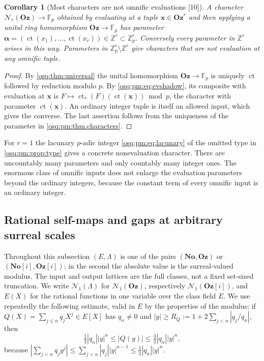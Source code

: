 \documentclass[11pt,letterpaper]{article}
\numberwithin{equation}{section}
\newtheorem{corollary}[corollary]{Corollary}
\theoremstyle{definition}
\theoremstyle{remark}
\theoremstyle{plain}
\newcommand{\No}{\mathbf{No}}
\newcommand{\Oz}{\mathbf{Oz}}
\newcommand{\SC}{\No[i]}
\newcommand{\GOz}{\Oz[i]}
\newcommand{\Z}{\mathbb Z}
\newcommand{\F}{\mathbb F}
\newcommand{\ct}{\operatorname{ct}}
\newcommand{\Num}{\mathscr N}
\newcommand{\src}[1]{\textup{\textsf{[#1]}}}
\begin{document}
\begin{corollary}[Most characters are not omnific evaluations \src{10}]
\label{osq:pm:cor:nonevaluation}
A character $\Num_r(\Oz)\to\F_p$ obtained by evaluating at a tuple $\mathbf x\in\Oz^r$
and then applying a unital ring homomorphism $\Oz\to\F_p$ has parameter
$\boldsymbol\alpha=(\ct(x_1),\dots,\ct(x_r))\in\Z^r\subset\Z_p^r$. Conversely every
parameter in $\Z^r$ arises in this way. Parameters in $\Z_p^r\setminus\Z^r$ give
characters that are not evaluation at any omnific tuple.
\end{corollary}
\begin{proof}
By \cref{osq:thm:universal} the unital homomorphism $\Oz\to\F_p$ is uniquely $\ct$
followed by reduction modulo $p$. By \eqref{osq:pm:eq:evshadow}, its composite with
evaluation at $\mathbf x$ is $F\mapsto\ct_*(F)(\ct(\mathbf x))\bmod p$, the character with
parameter $\ct(\mathbf x)$. An ordinary integer tuple is itself an allowed input, which
gives the converse. The last assertion follows from the uniqueness of the parameter in
\cref{osq:pm:thm:characters}.
\end{proof}

For $r=1$ the lacunary $p$-adic integer \eqref{osq:pm:eq:lacunary} of the omitted type in
\cref{osq:pm:prop:type} gives a concrete nonevaluation character. There are uncountably
many parameters and only countably many integer ones. The enormous class of omnific inputs
does not enlarge the evaluation parameters beyond the ordinary integers, because the
constant term of every omnific input is an ordinary integer.

\subsection{Rational self-maps and gaps at arbitrary surreal scales}
\label{osq:pm:sub:rigidity}

Throughout this subsection $(E,\Lambda)$ is one of the pairs $(\No,\Oz)$ or $(\SC,\GOz)$;
in the second the absolute value is the surreal-valued modulus. The input and output
lattices are the full classes, not a fixed set-sized truncation. We write $\Num_1(\Lambda)$
for $\Num_1(\Oz)$, respectively $\Num_1(\GOz)$, and $E(X)$ for the rational functions in
one variable over the class field $E$. We use repeatedly the following estimate, valid in
$E$ by the properties of the modulus: if $Q(X)=\sum_{j\le n}q_jX^j\in E[X]$ has
$q_n\ne0$ and $|y|\ge R_Q:=1+2\sum_{j<n}|q_j/q_n|$, then
\begin{equation}\label{osq:pm:eq:polyest}
 \tfrac12|q_n||y|^n\le|Q(y)|\le\tfrac32|q_n||y|^n,
\end{equation}
because $|\sum_{j<n}q_jy^j|\le\sum_{j<n}|q_j||y|^{n-1}\le\frac12|q_n||y|^n$.
\end{document}
